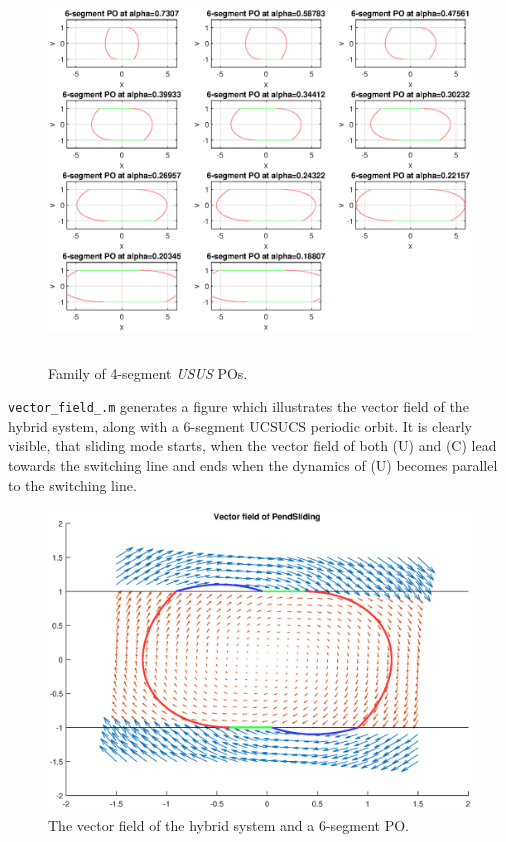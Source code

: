 \documentclass{article}
\begin{document}
\begin{figure}[h!]
	\centering 
	\includegraphics[height=10cm]{fig4}
	\caption{Family of 4-segment \emph{USUS} POs. \label{fig:4}}
\end{figure}

\newpage

\texttt{vector\_field\_.m} generates a figure which illustrates the vector field of the hybrid system, along with a 6-segment UCSUCS periodic orbit. It is clearly visible, that sliding mode starts, when the vector field of both (U) and (C) lead towards the switching line and ends when the dynamics of (U) becomes parallel to the switching line.

\begin{figure}[h!]
	\centering 
	\includegraphics[height=8cm]{fig5}
	\caption{The vector field of the hybrid system and a 6-segment PO.\label{fig:5}}
\end{figure}
\end{document}
